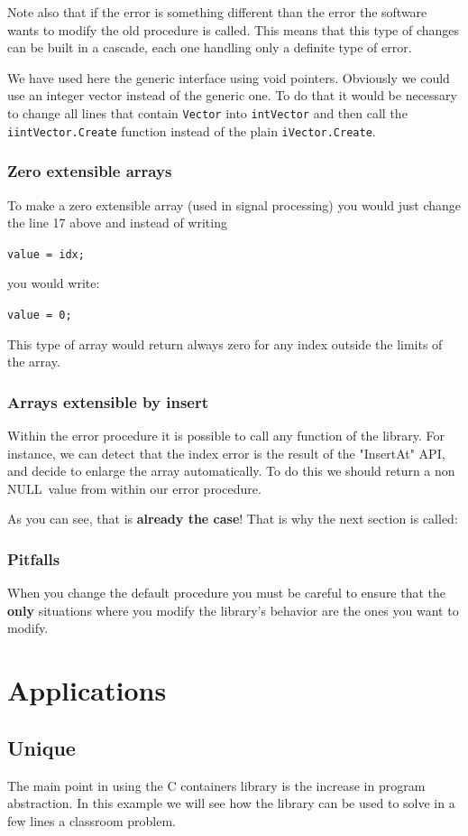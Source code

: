 \documentclass[12pt,a4paper]{memoir} %
\newif\iftth
\newcommand{\Null}{{\iftth \ NULL \else \footnotesize NULL\  \fi}}
\begin{document}
{{Note also that if the error is something different than the error the software wants to modify the old procedure is called. This means that
this type of changes can be built in a cascade, each one handling only a definite type of error.

We have used here the generic interface using void pointers. Obviously we could use an integer vector instead of the generic one. To do that it would 
be necessary to change all lines that contain \verb,Vector, into \verb,intVector, and then call the \verb,iintVector.Create, function
instead of the plain \verb,iVector.Create,.

\subsection{Zero extensible arrays}
To make a zero extensible array (used in  signal processing) you would just change the line 17 above and instead of writing

\verb,value = idx;,

you would write:

\verb,value = 0;,

This type of array would return always zero for any index outside the limits of the array.
\subsection{Arrays extensible by insert}
Within the error procedure it is possible to call any function of the library. For instance, we can detect that the index error is the
result of the "InsertAt" API, and decide to enlarge the array automatically. To do this we should return a non \Null value from within  our
error procedure.

As you can see, that is \textbf{already the case}! That is why the next section is called:

\subsection{Pitfalls}
When you change the default procedure you must be careful to ensure that the \textbf{only} situations where you modify the library's behavior are
the ones you want to modify. 

\chapter{Applications}
\section{Unique}
The main point in using the C containers library is the increase in
program abstraction. In this example we will see how the library
can be used to solve in a few lines a classroom problem.

}}
\end{document}
